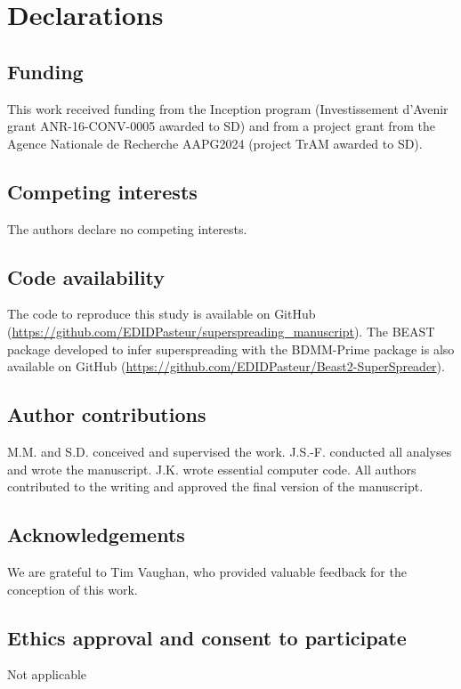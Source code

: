 \documentclass[lineno,pdflatex,sn-nature]{sn-jnl}%
\theoremstyle{thmstyleone}%
\theoremstyle{thmstyletwo}%
\theoremstyle{thmstylethree}%
\begin{document}
\section*{Declarations}

\subsection*{Funding}
This work received funding from the Inception program (Investissement d’Avenir grant ANR-16-CONV-0005 awarded to SD) and from a project grant from the Agence Nationale de Recherche AAPG2024 (project TrAM awarded to SD).

\subsection*{Competing interests}
The authors declare no competing interests.

\subsection*{Code availability}
The code to reproduce this study is available on GitHub (\href{https://github.com/EDIDPasteur/superspreading_manuscript}{https://github.com/EDIDPasteur/superspreading\_manuscript}). The BEAST package developed to infer superspreading with the BDMM-Prime package is also available on GitHub (\href{https://github.com/EDIDPasteur/Beast2-SuperSpreader}{https://github.com/EDIDPasteur/Beast2-SuperSpreader}).

\subsection*{Author contributions}
M.M. and S.D. conceived and supervised the work. J.S.-F. conducted all analyses and wrote the manuscript. J.K. wrote essential computer code. All authors contributed to the writing and approved the final version of the manuscript.

\subsection*{Acknowledgements}
We are grateful to Tim Vaughan, who provided valuable feedback for the conception of this work.

\subsection*{Ethics approval and consent to participate}
Not applicable
\end{document}

